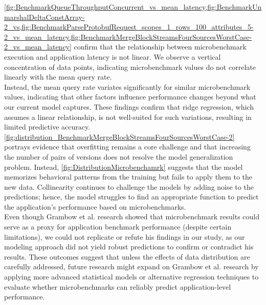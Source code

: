 \cref{fig:BenchmarkQueueThroughputConcurrent_vs_mean_latency,fig:BenchmarkUnmarshalDeltaConstArray-2_vs,fig:BenchmarkParseProtobufRequest_scopes_1_rows_100_attributes_5-2_vs_mean_latency,fig:BenchmarkMergeBlockStreamsFourSourcesWorstCase-2_vs_mean_latency} confirm that the relationship between microbenchmark execution and application latency is not linear. We observe a vertical concentration of data points, indicating microbenchmark values do not correlate linearly with the mean query rate. \\
Instead, the mean query rate variates significantly for similar microbenchmark values, indicating that other factors influence performance changes beyond what our current model captures. These findings confirm that ridge regression, which assumes a linear relationship, is not well-suited for such variations, resulting in limited predictive accuracy. \\
\cref{fig:distribution_BenchmarkMergeBlockStreamsFourSourcesWorstCase-2}
portrays evidence that overfitting remains a core challenge and that increasing the number of pairs of versions does not resolve the model generalization problem. Instead, \cref{fig:DistributionMicrobenchamrk} suggests that the model memorizes behavioral patterns from the training but fails to apply them to the new data. Collinearity continues to challenge the models by adding noise to the predictions; hence, the model struggles to find an appropriate function to predict the application's performance based on microbenchmarks. \\
Even though Grambow et al. \cite{grambow} research showed that microbenchmark results could serve as a proxy for application benchmark performance (despite certain limitations), we could not replicate or refute his findings in our study, as our modeling approach did not yield robust predictions to confirm or contradict his results. These outcomes suggest that unless the effects of data distribution are carefully addressed, future research might expand on Grambow et al. \cite{grambow} research by applying more advanced statistical models or alternative regression techniques to evaluate whether microbenchmarks can reliably predict application-level performance.

